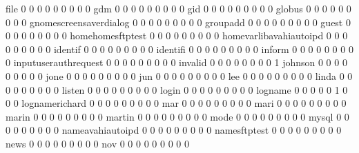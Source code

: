 \documentclass[compress,8pt]{beamer}
\begin{document}
\begin{frame}
\begin{Schunk}
  file                                       0   0   0   0   0   0   0   0   0
  gdm                                        0   0   0   0   0   0   0   0   0
  gid                                        0   0   0   0   0   0   0   0   0
  globus                                     0   0   0   0   0   0   0   0   0
  gnomescreensaverdialog                     0   0   0   0   0   0   0   0   0
  groupadd                                   0   0   0   0   0   0   0   0   0
  guest                                      0   0   0   0   0   0   0   0   0
  homehomesftptest                           0   0   0   0   0   0   0   0   0
  homevarlibavahiautoipd                     0   0   0   0   0   0   0   0   0
  identif                                    0   0   0   0   0   0   0   0   0
  identifi                                   0   0   0   0   0   0   0   0   0
  inform                                     0   0   0   0   0   0   0   0   0
  inputuserauthrequest                       0   0   0   0   0   0   0   0   0
  invalid                                    0   0   0   0   0   0   0   0   1
  johnson                                    0   0   0   0   0   0   0   0   0
  jone                                       0   0   0   0   0   0   0   0   0
  jun                                        0   0   0   0   0   0   0   0   0
  lee                                        0   0   0   0   0   0   0   0   0
  linda                                      0   0   0   0   0   0   0   0   0
  listen                                     0   0   0   0   0   0   0   0   0
  login                                      0   0   0   0   0   0   0   0   0
  logname                                    0   0   0   0   0   1   0   0   0
  lognamerichard                             0   0   0   0   0   0   0   0   0
  mar                                        0   0   0   0   0   0   0   0   0
  mari                                       0   0   0   0   0   0   0   0   0
  marin                                      0   0   0   0   0   0   0   0   0
  martin                                     0   0   0   0   0   0   0   0   0
  mode                                       0   0   0   0   0   0   0   0   0
  mysql                                      0   0   0   0   0   0   0   0   0
  nameavahiautoipd                           0   0   0   0   0   0   0   0   0
  namesftptest                               0   0   0   0   0   0   0   0   0
  news                                       0   0   0   0   0   0   0   0   0
  nov                                        0   0   0   0   0   0   0   0   0

\end{Schunk}
\end{frame}
\end{document}
